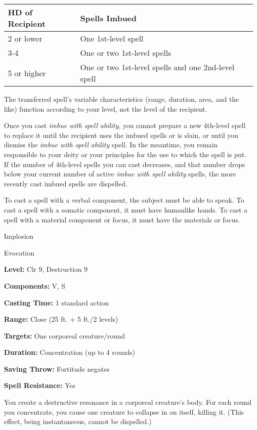 \documentclass{article}
\begin{document}
\begin{tabular}{|>{\raggedright}p{67pt}|>{\raggedright}p{201pt}|}
\hline
H\textbf{D of Recipient} & S\textbf{pells Imbued}\tabularnewline
\hline
2 or lower & One 1st-level spell\tabularnewline
\hline
3-4 & One or two 1st-level spells\tabularnewline
\hline
5 or higher & One or two 1st-level spells and one 2nd-level spell\tabularnewline
\hline
\end{tabular}

The transferred spell's variable characteristics (range, duration, area, and the 
like) function according to your level, not the level of the recipient.

Once you cast \textit{imbue with spell ability, }you cannot prepare a new 4th-level 
spell to replace it until the recipient uses the imbued spells or is slain, or 
until you dismiss the \textit{imbue with spell ability }spell. In the meantime, 
you remain responsible to your deity or your principles for the use to which the 
spell is put. If the number of 4th-level spells you can cast decreases, and that 
number drops below your current number of active \textit{imbue with spell ability 
}spells, the more recently cast imbued spells are dispelled.

To cast a spell with a verbal component, the subject must be able to speak. To 
cast a spell with a somatic component, it must have humanlike hands. To cast a 
spell with a material component or focus, it must have the materials or focus.

\vspace{12pt}
Implosion

Evocation

\textbf{Level:} Clr 9, Destruction 9

\textbf{Components:} V, S

\textbf{Casting Time:} 1 standard action

\textbf{Range:} Close (25 ft. + 5 ft./2 levels)

\textbf{Targets:} One corporeal creature/round

\textbf{Duration:} Concentration (up to 4 rounds)

\textbf{Saving Throw:} Fortitude negates

\textbf{Spell Resistance:} Yes

You create a destructive resonance in a corporeal creature's body. For each round 
you concentrate, you cause one creature to collapse in on itself, killing it. (This 
effect, being instantaneous, cannot be dispelled.)
\end{document}

